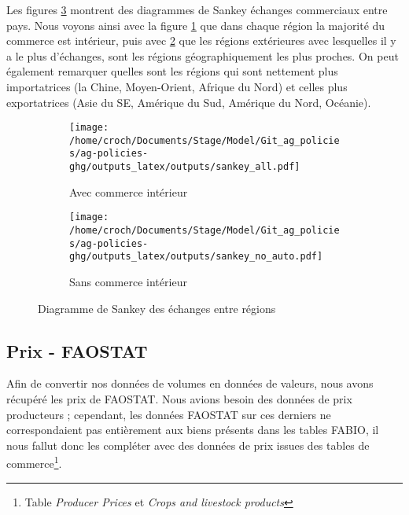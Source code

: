 Les figures \ref{fig:sankey} montrent des diagrammes de Sankey échanges commerciaux entre pays. Nous voyons ainsi avec la figure \ref{fig:sankey1} que dans chaque région la majorité du commerce est intérieur, puis avec \ref{fig:sankey2} que les régions extérieures avec lesquelles il y a le plus d'échanges, sont les régions géographiquement les plus proches. On peut également remarquer quelles sont les régions qui sont nettement plus importatrices (la Chine, Moyen-Orient, Afrique du Nord) et celles plus exportatrices (Asie du SE, Amérique du Sud, Amérique du Nord, Océanie).

\begin{figure}[hbt!]
    \centering
    \begin{subfigure}[b]{0.495\textwidth}
        \centering
        \texttt{[image: /home/croch/Documents/Stage/Model/Git\_ag\_policies/ag-policies-ghg/outputs\_latex/outputs/sankey\_all.pdf]}
        \caption{Avec commerce intérieur}
        \label{fig:sankey1}
    \end{subfigure}
    \begin{subfigure}[b]{0.495\textwidth}
        \centering
        \texttt{[image: /home/croch/Documents/Stage/Model/Git\_ag\_policies/ag-policies-ghg/outputs\_latex/outputs/sankey\_no\_auto.pdf]}
        \caption{Sans commerce intérieur}
        \label{fig:sankey2}
    \end{subfigure}
    \caption{Diagramme de Sankey des échanges entre régions}
    \label{fig:sankey}
\end{figure}

\subsection{Prix - FAOSTAT}\label{subsec:prix}

Afin de convertir nos données de volumes en données de valeurs, nous avons récupéré les prix de FAOSTAT. Nous avions besoin des données de prix producteurs ; cependant, les données FAOSTAT sur ces derniers ne correspondaient pas entièrement aux biens présents dans les tables FABIO, il nous fallut donc les compléter avec des données de prix issues des tables de commerce\footnote{Table \textit{Producer Prices} et \textit{Crops and livestock products}}.

